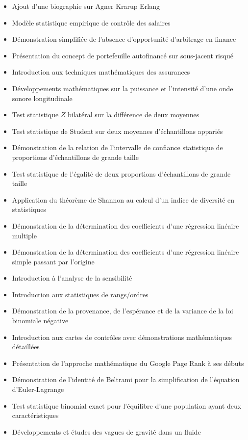 \begin{itemize}
\begin{itemize}[noitemsep]
				\item Ajout d'une biographie sur Agner Krarup Erlang
				\item Modèle statistique empirique de contrôle des salaires
				\item Démonstration simplifiée de l'absence d'opportunité d'arbitrage en finance
				\item Présentation du concept de portefeuille autofinancé sur sous-jacent risqué
				\item  Introduction aux techniques mathématiques des assurances
				\item Développements mathématiques sur la puissance et l'intensité d'une onde sonore longitudinale
				\item  Test statistique $Z$ bilatéral sur la différence de deux moyennes
				\item Test statistique de Student sur deux moyennes d'échantillons appariés
				\item Démonstration de la relation de l'intervalle de confiance statistique de proportions d'échantillons de grande taille
				\item Test statistique de l'égalité de deux proportions d'échantillons de grande taille
				\item Application du théorème de Shannon au calcul d'un indice de diversité en statistiques
				\item Démonstration de la détermination des coefficients d'une régression linéaire multiple
				\item Démonstration de la détermination des coefficients d'une régression linéaire simple passant par l'origine
				\item Introduction à l'analyse de la sensibilité
				\item Introduction aux statistiques de rangs/ordres
				\item Démonstration de la provenance, de l'espérance et de la variance de la loi binomiale négative
				\item Introduction aux cartes de contrôles avec démonstrations mathématiques détaillées
				\item Présentation de l'approche mathématique du Google Page Rank à ses débuts
				\item Démonstration de l'identité de Beltrami pour la simplification de l'équation d'Euler-Lagrange
				\item Test statistique binomial exact pour l'équilibre d'une population ayant deux caractéristiques
				\item Développements et études des vagues de gravité dans un fluide

\end{itemize}
\end{itemize}
